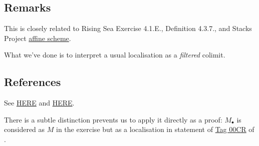 \subsection{Remarks}
This is closely related to Rising Sea Exercise 4.1.E., Definition 4.3.7., and Stacks Project \href{https://stacks.math.columbia.edu/tag/01HR}{affine scheme}.

What we've done is to interpret a usual localisation as a \textit{filtered} colimit.

\subsection{References}

See \href{https://math.stackexchange.com/questions/751079/localization-of-a-module-as-direct-limit}{HERE} and \href{https://math.stackexchange.com/questions/505479/does-localization-commute-with-direct-inverse-limits}{HERE}.


There is a subtle distinction prevents us to apply it directly as a proof: $M_{\bullet}$ is considered as $M$ in the exercise but as a localisation in statement of \href{https://stacks.math.columbia.edu/tag/00CR}{Tag 00CR} of \cite{stacks-project}.

